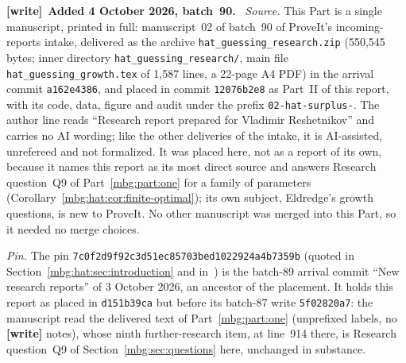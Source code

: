\documentclass[11pt,letterpaper]{article}
\theoremstyle{definition}
\newenvironment{writenote}[1][]{\par\smallskip\begingroup\small
 \noindent\textbf{[write]}\if\relax\detokenize{#1}\relax\else~\textbf{#1.}\fi\ }%
 {\par\endgroup\smallskip}
\begin{document}
\begin{writenote}[Added 4 October 2026, batch~90]
\emph{Source.} This Part is a single manuscript, printed in full: manuscript~02 of batch~90 of ProveIt's incoming-reports intake, delivered as the archive \texttt{hat\_\allowbreak guessing\_\allowbreak research.zip} (550,545 bytes; inner directory \texttt{hat\_\allowbreak guessing\_\allowbreak research/}, main file \texttt{hat\_\allowbreak guessing\_\allowbreak growth.tex} of 1,587 lines, a 22-page A4 PDF) in the arrival commit \texttt{a162e4386}, and placed in commit \texttt{12076b2e8} as Part~II of this report, with its code, data, figure and audit under the prefix \texttt{02-hat-surplus-}. The author line reads ``Research report prepared for Vladimir Reshetnikov'' and carries no AI wording; like the other deliveries of the intake, it is AI-assisted, unrefereed and not formalized. It was placed here, not as a report of its own, because it names this report as its most direct source and answers Research question~Q9 of Part~\ref{mbg:part:one} for a family of parameters (Corollary~\ref{mbg:hat:cor:finite-optimal}); its own subject, Eldredge's growth questions, is new to ProveIt. No other manuscript was merged into this Part, so it needed no merge choices.

\emph{Pin.} The pin \texttt{7c0f2d9f92c3d51ec85703bed1022924a4b7359b} (quoted in Section~\ref{mbg:hat:sec:introduction} and in~\cite{hat:ProveItBoxes}) is the batch-89 arrival commit ``New research reports'' of 3 October 2026, an ancestor of the placement. It holds this report as placed in \texttt{d151b39ca} but before its batch-87 write \texttt{5f02820a7}: the manuscript read the delivered text of Part~\ref{mbg:part:one} (unprefixed labels, no \textbf{[write]} notes), whose ninth further-research item, at line~914 there, is Research question~Q9 of Section~\ref{mbg:sec:questions} here, unchanged in substance.


\end{writenote}
\end{document}

